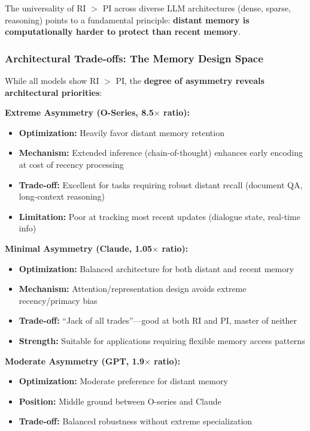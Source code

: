 \documentclass{article}
\begin{document}
The universality of RI $>$ PI across diverse LLM architectures (dense, sparse, reasoning) points to a fundamental principle: \textbf{distant memory is computationally harder to protect than recent memory}.

\subsubsection{Architectural Trade-offs: The Memory Design Space}

While all models show RI $>$ PI, the \textbf{degree of asymmetry reveals architectural priorities}:

\textbf{Extreme Asymmetry (O-Series, 8.5$\times$ ratio):}
\begin{itemize}
    \item \textbf{Optimization:} Heavily favor distant memory retention
    \item \textbf{Mechanism:} Extended inference (chain-of-thought) enhances early encoding at cost of recency processing
    \item \textbf{Trade-off:} Excellent for tasks requiring robust distant recall (document QA, long-context reasoning)
    \item \textbf{Limitation:} Poor at tracking most recent updates (dialogue state, real-time info)
\end{itemize}

\textbf{Minimal Asymmetry (Claude, 1.05$\times$ ratio):}
\begin{itemize}
    \item \textbf{Optimization:} Balanced architecture for both distant and recent memory
    \item \textbf{Mechanism:} Attention/representation design avoids extreme recency/primacy bias
    \item \textbf{Trade-off:} ``Jack of all trades''---good at both RI and PI, master of neither
    \item \textbf{Strength:} Suitable for applications requiring flexible memory access patterns
\end{itemize}

\textbf{Moderate Asymmetry (GPT, 1.9$\times$ ratio):}
\begin{itemize}
    \item \textbf{Optimization:} Moderate preference for distant memory
    \item \textbf{Position:} Middle ground between O-series and Claude
    \item \textbf{Trade-off:} Balanced robustness without extreme specialization
\end{itemize}
\end{document}

